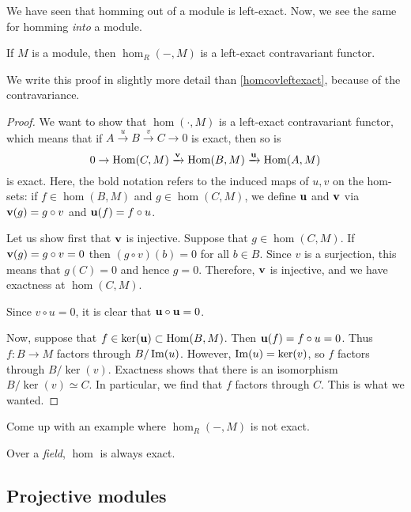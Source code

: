 We have seen that homming out of a module is left-exact. Now, we see the same
for homming \emph{into} a module.

\begin{proposition} \label{homcontleftexact}
If $M$ is a module, then $\hom_R(-,M)$ is a left-exact contravariant functor.
\end{proposition}

We write this proof in slightly more detail than \cref{homcovleftexact},
because of the
contravariance.
\begin{proof}
We want to show that $\hom(\cdot, M)$ is a left-exact contravariant functor,
which means that
if $ A \xrightarrow u B \xrightarrow v C \to 0$ is exact, then so is
$$
0 \to \operatorname{Hom}(C, M) \xrightarrow{\mathbf{v}} \operatorname{Hom}(B, M) \xrightarrow{\mathbf{u}} \operatorname{Hom}(A, M)
$$
is exact. Here, the bold notation refers to the induced maps of $u,v$ on the
hom-sets: if $f \in \hom(B,M)$ and $g \in \hom(C, M)$, we define
$\mathbf{u}$ and $\mathbf{v}$ via $\mathbf{v}(g) = g \circ v$ and
$\mathbf{u}(f) = f \circ u$.

Let us show first that $\mathbf{v}$ is injective.
Suppose that $g \in \hom(C, M)$. If $\mathbf{v}(g) = g \circ v = 0$ then
$(g \circ v)(b) = 0$ for all $b \in B$. Since $v$ is a surjection, this means
that $g(C) = 0$ and hence $g = 0$. Therefore, $\mathbf{v}$ is injective, and we
have exactness at $\hom(C, M)$.

Since $v \circ u = 0$, it is clear that $\mathbf{u} \circ \mathbf{u} = 0$.

Now, suppose that $f \in \ker(\mathbf{u}) \subset \operatorname{Hom}(B, M)$. Then
$\mathbf{u}(f) = f \circ u = 0$.
Thus $f: B \to M$ factors through $B/\operatorname{Im}(u)$.
However, $\operatorname{Im}(u) = \ker(v)$, so $f$ factors through $B/\ker(v)$.
Exactness shows that there is an isomorphism $B/\ker(v) \simeq C$.
In particular, we find that $f$ factors through $C$. This is what we wanted.
\end{proof}


\begin{exercise}
Come up with an example where $\hom_R(-, M)$ is not exact.
\end{exercise}

\begin{exercise}
Over a \emph{field}, $\hom$ is always exact.
\end{exercise}

\subsection{Projective modules}

